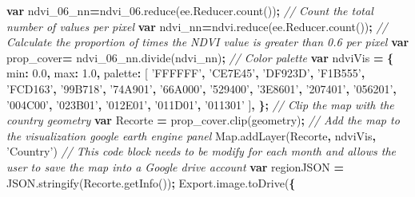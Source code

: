 \documentclass[
  10pt,
  b5paper,
]{book}
\newenvironment{Shaded}{\begin{snugshade}}{\end{snugshade}}
\newcommand{\AttributeTok}[1]{\textcolor[rgb]{0.77,0.63,0.00}{#1}}
\newcommand{\CommentTok}[1]{\textcolor[rgb]{0.56,0.35,0.01}{\textit{#1}}}
\newcommand{\DataTypeTok}[1]{\textcolor[rgb]{0.13,0.29,0.53}{#1}}
\newcommand{\FloatTok}[1]{\textcolor[rgb]{0.00,0.00,0.81}{#1}}
\newcommand{\KeywordTok}[1]{\textcolor[rgb]{0.13,0.29,0.53}{\textbf{#1}}}
\newcommand{\NormalTok}[1]{#1}
\newcommand{\OperatorTok}[1]{\textcolor[rgb]{0.81,0.36,0.00}{\textbf{#1}}}
\newcommand{\StringTok}[1]{\textcolor[rgb]{0.31,0.60,0.02}{#1}}
\newcommand{\VariableTok}[1]{\textcolor[rgb]{0.00,0.00,0.00}{#1}}
\begin{document}
\begin{Shaded}
\begin{Highlighting}[]
\KeywordTok{var}\NormalTok{ ndvi_06_nn}\OperatorTok{=}\VariableTok{ndvi_06}\NormalTok{.}\AttributeTok{reduce}\NormalTok{(}\VariableTok{ee}\NormalTok{.}\VariableTok{Reducer}\NormalTok{.}\AttributeTok{count}\NormalTok{())}\OperatorTok{;}
 \CommentTok{// Count the total number of values per pixel}
\KeywordTok{var}\NormalTok{ ndvi_nn}\OperatorTok{=}\VariableTok{ndvi}\NormalTok{.}\AttributeTok{reduce}\NormalTok{(}\VariableTok{ee}\NormalTok{.}\VariableTok{Reducer}\NormalTok{.}\AttributeTok{count}\NormalTok{())}\OperatorTok{;}
 \CommentTok{// Calculate the proportion of times the NDVI value is greater than 0.6 per pixel}
\KeywordTok{var}\NormalTok{ prop_cover}\OperatorTok{=} \VariableTok{ndvi_06_nn}\NormalTok{.}\AttributeTok{divide}\NormalTok{(ndvi_nn)}\OperatorTok{;}
 \CommentTok{// Color palette}
\KeywordTok{var}\NormalTok{ ndviVis }\OperatorTok{=} \OperatorTok{\{}
  \DataTypeTok{min}\OperatorTok{:} \FloatTok{0.0}\OperatorTok{,}
  \DataTypeTok{max}\OperatorTok{:} \FloatTok{1.0}\OperatorTok{,}
  \DataTypeTok{palette}\OperatorTok{:}\NormalTok{ [}
    \StringTok{'FFFFFF'}\OperatorTok{,} \StringTok{'CE7E45'}\OperatorTok{,} \StringTok{'DF923D'}\OperatorTok{,} \StringTok{'F1B555'}\OperatorTok{,} \StringTok{'FCD163'}\OperatorTok{,} \StringTok{'99B718'}\OperatorTok{,} \StringTok{'74A901'}\OperatorTok{,}
    \StringTok{'66A000'}\OperatorTok{,} \StringTok{'529400'}\OperatorTok{,} \StringTok{'3E8601'}\OperatorTok{,} \StringTok{'207401'}\OperatorTok{,} \StringTok{'056201'}\OperatorTok{,} \StringTok{'004C00'}\OperatorTok{,} \StringTok{'023B01'}\OperatorTok{,}
    \StringTok{'012E01'}\OperatorTok{,} \StringTok{'011D01'}\OperatorTok{,} \StringTok{'011301'}
\NormalTok{ ]}\OperatorTok{,}
\OperatorTok{\};}
 \CommentTok{// Clip the map with the country geometry}
\KeywordTok{var}\NormalTok{ Recorte }\OperatorTok{=} \VariableTok{prop_cover}\NormalTok{.}\AttributeTok{clip}\NormalTok{(geometry)}\OperatorTok{;}
 \CommentTok{// Add the map to the visualization google earth engine panel}
\VariableTok{Map}\NormalTok{.}\AttributeTok{addLayer}\NormalTok{(Recorte}\OperatorTok{,}\NormalTok{ ndviVis}\OperatorTok{,} \StringTok{'Country'}\NormalTok{)}
 \CommentTok{// This code block needs to be modify for each month and allows the user to save the map into a Google drive account}
\KeywordTok{var}\NormalTok{ regionJSON }\OperatorTok{=} \VariableTok{JSON}\NormalTok{.}\AttributeTok{stringify}\NormalTok{(}\VariableTok{Recorte}\NormalTok{.}\AttributeTok{getInfo}\NormalTok{())}\OperatorTok{;}
\VariableTok{Export}\NormalTok{.}\VariableTok{image}\NormalTok{.}\AttributeTok{toDrive}\NormalTok{(}\OperatorTok{\{}

\end{Highlighting}
\end{Shaded}
\end{document}
